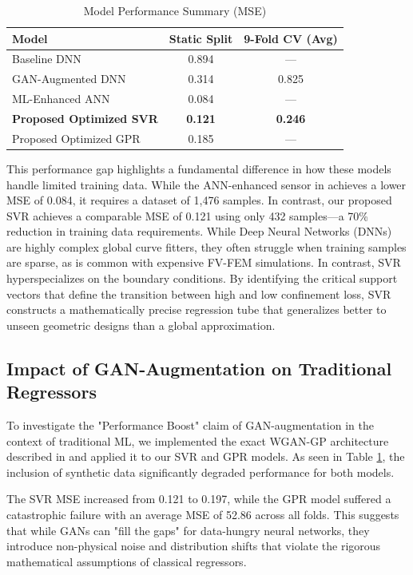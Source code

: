 \documentclass[conference]{IEEEtran}
\begin{document}
\begin{table}[htbp]
\caption{Model Performance Summary (MSE)}
\begin{center}
\begin{tabular}{lcc}
\toprule
\textbf{Model} & \textbf{Static Split} & \textbf{9-Fold CV (Avg)} \\
\midrule
Baseline DNN \cite{b1} & 0.894 & --- \\
GAN-Augmented DNN \cite{b1} & 0.314 & 0.825 \\
ML-Enhanced ANN \cite{b10} & 0.084 & --- \\
\textbf{Proposed Optimized SVR} & \textbf{0.121} & \textbf{0.246} \\
Proposed Optimized GPR & 0.185 & --- \\
\bottomrule
\end{tabular}
\label{tab:benchmark}
\end{center}
\end{table}

This performance gap highlights a fundamental difference in how these models handle limited training data. While the ANN-enhanced sensor in \cite{b10} achieves a lower MSE of 0.084, it requires a dataset of 1,476 samples. In contrast, our proposed SVR achieves a comparable MSE of 0.121 using only 432 samples---a 70\% reduction in training data requirements.
 While Deep Neural Networks (DNNs) are highly complex global curve fitters, they often struggle when training samples are sparse, as is common with expensive FV-FEM simulations. In contrast, SVR hyperspecializes on the boundary conditions. By identifying the critical support vectors that define the transition between high and low confinement loss, SVR constructs a mathematically precise regression tube that generalizes better to unseen geometric designs than a global approximation.

\subsection{Impact of GAN-Augmentation on Traditional Regressors}
To investigate the "Performance Boost" claim of GAN-augmentation in the context of traditional ML, we implemented the exact WGAN-GP architecture described in \cite{b1} and applied it to our SVR and GPR models. As seen in Table \ref{tab:benchmark}, the inclusion of synthetic data significantly degraded performance for both models. 

The SVR MSE increased from 0.121 to 0.197, while the GPR model suffered a catastrophic failure with an average MSE of 52.86 across all folds. This suggests that while GANs can "fill the gaps" for data-hungry neural networks, they introduce non-physical noise and distribution shifts that violate the rigorous mathematical assumptions of classical regressors.
\end{document}
